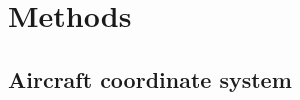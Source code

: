 \documentclass[amt, manuscript]{copernicus}
\begin{document}




\section{Methods}

\subsection{Aircraft coordinate system}
\end{document}
